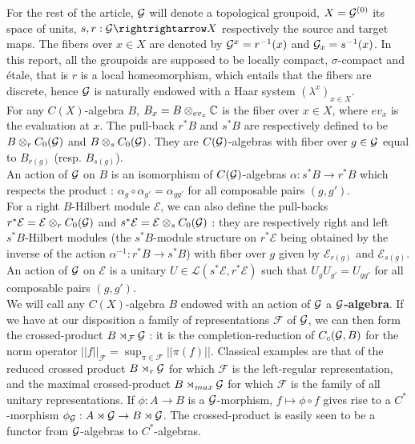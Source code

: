 For the rest of the article, $\mathcal G$ will denote a topological groupoid, $X=\mathcal G^{(0)}$ its space of units, $s,r: \G\rightrightarrow X$ respectively the source and target maps. The fibers over $x\in X$ are denoted by $\mathcal G^x = r^{-1}(x)$ and $\mathcal G_x=s^{-1}(x)$. In this report, all the groupoids are supposed to be locally compact, $\sigma$-compact and étale, that is $r$ is a local homeomorphism, which entails that the fibers are discrete, hence $\mathcal G$ is naturally endowed with a Haar system $(\lambda^x)_{x\in X}$.\\
For any $C(X)$-algebra $B$, $B_x = B\otimes_{ev_x} \mathbb C$ is the fiber over $x\in X$, where $ev_x$ is the evaluation at $x$. The pull-back $r^*B$ and $s^*B$ are respectively defined to be $B\otimes_r C_0(\mathcal G) $ and $B\otimes_s C_0(\mathcal G) $. They are $C(\mathcal G)$-algebras with fiber over $g\in \mathcal G$ equal to $B_{r(g)}$ (resp. $B_{s(g)}$).\\
An action of $\mathcal G$ on $B$ is an isomorphism of $C(\mathcal G)$-algebras $\alpha : s^*B\rightarrow r^*B$ which respects the product : $\alpha_g\circ\alpha_{g'}=\alpha_{gg'}$ for all composable pairs $(g,g')$.\\
For a right $B$-Hilbert module $\mathcal E$, we can also define the pull-backs $r^*\mathcal E = \mathcal E\otimes_r C_0(\mathcal G) $ and $s^*\mathcal E = \mathcal E\otimes_s C_0(\mathcal G) $ : they are respectively right and left $s^*B$-Hilbert modules (the $s^*B$-module structure on $r^*\mathcal E$ being obtained by the inverse of the action $\alpha^{-1}: r^*B\rightarrow s^*B$) with fiber over $g$ given by $\mathcal E_{r(g)}$ and $\mathcal E_{s(g)}$.\\
An action of $\mathcal G$ on $\mathcal E$ is a unitary $U\in \mathcal L(s^*\mathcal E,r^*\mathcal E) $ such that $U_g U_{g'}=U_{gg'}$ for all composable pairs $(g,g')$.\\
We will call any $C(X)$-algebra $B$ endowed with an action of $\mathcal G$ a \textbf{$\mathcal G$-algebra}. If we have at our disposition a family of representations $\mathcal F$ of $\mathcal G$, we can then form the crossed-product $B\rtimes_{\mathcal F} \mathcal G$ : it is the completion-reduction of $C_c(\mathcal G,B)$ for the norm operator $||f||_{\mathcal F}= \sup_{\pi\in \mathcal F} ||\pi(f)||$. Classical examples are that of the reduced crossed product $B\rtimes_r \mathcal G$ for which $\mathcal F$ is the left-regular representation, and the maximal crossed-product $B\rtimes_{max}\mathcal G$ for which $\mathcal F$ is the family of all unitary representations. If $\phi : A\rightarrow B$ is a $\mathcal G$-morphism, $f\mapsto \phi\circ f$ gives rise to a $C^*$-morphism $\phi_\mathcal G : A\rtimes \mathcal G\rightarrow B\rtimes \mathcal G$. The crossed-product is easily seen to be a functor from $\mathcal G$-algebras to $C^*$-algebras.

